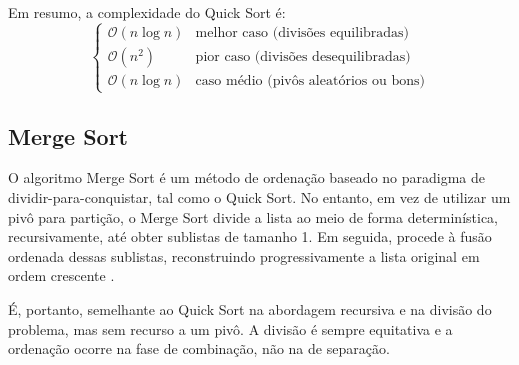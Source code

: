 \documentclass[conference]{IEEEtran}
\begin{document}
Em resumo, a complexidade do Quick Sort é:
\[
\begin{cases}
\mathcal{O}(n \log n) & \text{melhor caso (divisões equilibradas)} \\
\mathcal{O}(n^2) & \text{pior caso (divisões desequilibradas)} \\
\mathcal{O}(n \log n) & \text{caso médio (pivôs aleatórios ou bons)}
\end{cases}
\]

\subsection{Merge Sort}

O algoritmo Merge Sort é um método de ordenação baseado no paradigma de dividir-para-conquistar, tal como o Quick Sort. No entanto, em vez de utilizar um pivô para partição, o Merge Sort divide a lista ao meio de forma determinística, recursivamente, até obter sublistas de tamanho 1. Em seguida, procede à fusão ordenada dessas sublistas, reconstruindo progressivamente a lista original em ordem crescente \cite{mergsesort}.

É, portanto, semelhante ao Quick Sort na abordagem recursiva e na divisão do problema, mas sem recurso a um pivô. A divisão é sempre equitativa e a ordenação ocorre na fase de combinação, não na de separação.
\end{document}
